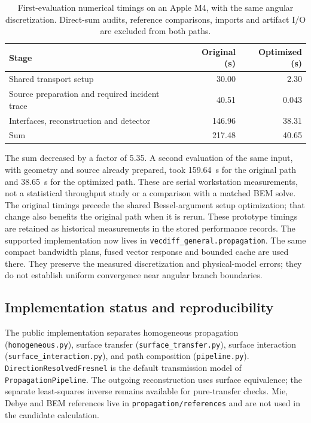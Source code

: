 \documentclass[11pt,a4paper]{article}
\numberwithin{equation}{section}
\begin{document}
\begin{table}[htbp]
\centering
\caption{First-evaluation numerical timings on an Apple M4, with the same
angular discretization. Direct-sum audits, reference comparisons, imports and
artifact I/O are excluded from both paths.}
\begin{tabular}{lrr}
\toprule
Stage & Original (s) & Optimized (s)\\
\midrule
Shared transport setup & 30.00 & 2.30\\
Source preparation and required incident trace & 40.51 & 0.043\\
Interfaces, reconstruction and detector & 146.96 & 38.31\\
\midrule
Sum & 217.48 & 40.65\\
\bottomrule
\end{tabular}
\end{table}

The sum decreased by a factor of 5.35. A second evaluation of the same input,
with geometry and source already prepared, took 159.64~s for the original path
and 38.65~s for the optimized path. These are serial workstation measurements,
not a statistical throughput study or a comparison with a matched BEM solve.
The original timings precede the shared Bessel-argument setup optimization;
that change also benefits the original path when it is rerun. These prototype timings are retained as historical measurements in the
stored performance records. The supported implementation now lives in
\texttt{vecdiff\_general.propagation}. The same compact bandwidth plans,
fused vector response and bounded cache are used there. They preserve the
measured discretization and physical-model errors; they do not establish
uniform convergence near angular branch boundaries.

\subsection{Implementation status and reproducibility}

The public implementation separates homogeneous propagation
(\texttt{homogeneous.py}), surface transfer (\texttt{surface\_transfer.py}),
surface interaction (\texttt{surface\_interaction.py}), and path composition
(\texttt{pipeline.py}). \texttt{DirectionResolvedFresnel} is the default
transmission model of \texttt{PropagationPipeline}. The outgoing reconstruction
uses surface equivalence; the separate least-squares inverse remains available
for pure-transfer checks. Mie, Debye and BEM references live in
\texttt{propagation/references} and are not used in the candidate calculation.
\end{document}
